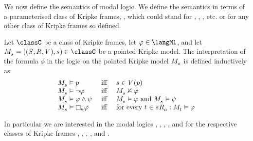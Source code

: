 We now define the semantics of modal logic.
We define the semantics in terms of a parameterised class of Kripke frames, \classC{}, which could stand for \classK{}, \classKF{}, \classKFF{}, etc. or for any other class of Kripke frames so defined.

\begin{definition}\label{ml-semantics}
Let $\classC$ be a class of Kripke frames, let $\phi \in \langMl$, and let $\kPModelAndTuple{\kStateS} \in \classC$ be a pointed Kripke model.
The interpretation of the formula $\phi$ in the logic \logicC{} on the pointed Kripke model $\kPModel{\kStateS}$ is defined inductively as:
$$
\begin{array}{lcl}
\kPModel{\kStateS} \entails \atomP & \text{ iff } & \kStateS \in \kValuation(\atomP)\\
\kPModel{\kStateS} \entails \lnot \phi & \text{ iff } & \kPModel{\kStateS} \nentails \phi\\
\kPModel{\kStateS} \entails \phi \land \psi & \text{ iff } & \kPModel{\kStateS} \entails \phi \text{ and } \kPModel{\kStateS} \entails \psi\\
\kPModel{\kStateS} \entails \necessaryA \phi & \text{ iff } & \text{for every } \kStateT \in \kSuccessorsA{\kStateS} : \kPModel{\kStateT} \entails \phi
\end{array}
$$
\end{definition}

In particular we are interested in the modal logics \logicK{}, \logicKF{}, \logicKFF{}, \logicKD{}, \logicSF{} and \logicS{} for the respective classes of Kripke frames \classK{}, \classKF{}, \classKFF{}, \classKD{}, \classSF{} and \classS{}.

